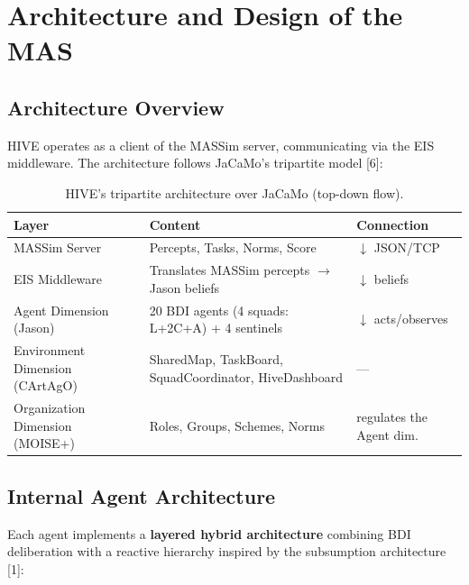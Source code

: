 \documentclass[11pt,a4paper]{article}
\begin{document}
\section{Architecture and Design of the MAS}

\subsection{Architecture Overview}
HIVE operates as a client of the MASSim server, communicating via the EIS middleware. The architecture follows JaCaMo's tripartite model [6]:

\begin{table}[H]
\centering
\begin{tabularx}{\linewidth}{l X l}
\toprule
\textbf{Layer} & \textbf{Content} & \textbf{Connection} \\
\midrule
MASSim Server & Percepts, Tasks, Norms, Score & $\downarrow$ JSON/TCP \\
EIS Middleware & Translates MASSim percepts $\rightarrow$ Jason beliefs & $\downarrow$ beliefs \\
Agent Dimension (Jason) & 20 BDI agents (4 squads: L+2C+A) + 4 sentinels & $\downarrow$ acts/observes \\
Environment Dimension (CArtAgO) & SharedMap, TaskBoard, SquadCoordinator, HiveDashboard & --- \\
Organization Dimension (MOISE+) & Roles, Groups, Schemes, Norms & regulates the Agent dim. \\
\bottomrule
\end{tabularx}
\caption{HIVE's tripartite architecture over JaCaMo (top-down flow).}
\end{table}

\subsection{Internal Agent Architecture}
Each agent implements a \textbf{layered hybrid architecture} combining BDI deliberation with a reactive hierarchy inspired by the subsumption architecture [1]:
\end{document}
